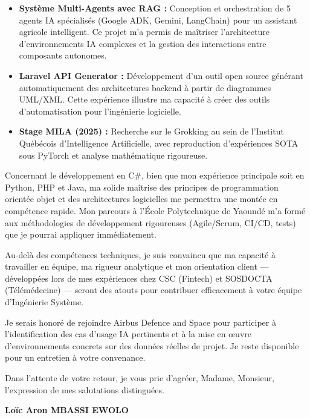 \documentclass[a4paper,11pt]{article}
\begin{document}
\vspace{0.2cm}

\begin{itemize}
    \item[\textbullet] \textbf{Système Multi-Agents avec RAG :} Conception et orchestration de 5 agents IA spécialisés (Google ADK, Gemini, LangChain) pour un assistant agricole intelligent. Ce projet m'a permis de maîtriser l'architecture d'environnements IA complexes et la gestion des interactions entre composants autonomes.
    
    \item[\textbullet] \textbf{Laravel API Generator :} Développement d'un outil open source générant automatiquement des architectures backend à partir de diagrammes UML/XML. Cette expérience illustre ma capacité à créer des outils d'automatisation pour l'ingénierie logicielle.
    
    \item[\textbullet] \textbf{Stage MILA (2025) :} Recherche sur le Grokking au sein de l'Institut Québécois d'Intelligence Artificielle, avec reproduction d'expériences SOTA sous PyTorch et analyse mathématique rigoureuse.
\end{itemize}

\vspace{0.3cm}

Concernant le développement en C\#, bien que mon expérience principale soit en Python, PHP et Java, ma solide maîtrise des principes de programmation orientée objet et des architectures logicielles me permettra une montée en compétence rapide. Mon parcours à l'École Polytechnique de Yaoundé m'a formé aux méthodologies de développement rigoureuses (Agile/Scrum, CI/CD, tests) que je pourrai appliquer immédiatement.

\vspace{0.3cm}

Au-delà des compétences techniques, je suis convaincu que ma capacité à travailler en équipe, ma rigueur analytique et mon orientation client — développées lors de mes expériences chez CSC (Fintech) et SOSDOCTA (Télémédecine) — seront des atouts pour contribuer efficacement à votre équipe d'Ingénierie Système.

\vspace{0.3cm}

Je serais honoré de rejoindre Airbus Defence and Space pour participer à l'identification des cas d'usage IA pertinents et à la mise en œuvre d'environnements concrets sur des données réelles de projet. Je reste disponible pour un entretien à votre convenance.

\vspace{0.4cm}

Dans l'attente de votre retour, je vous prie d'agréer, Madame, Monsieur, l'expression de mes salutations distinguées.

\vspace{1cm}

\noindent \textbf{Loïc Aron MBASSI EWOLO}
\end{document}
